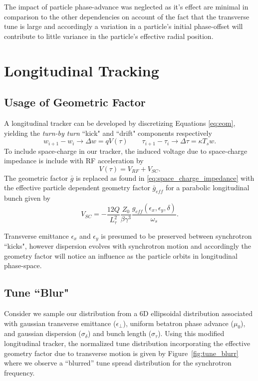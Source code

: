 The impact of particle phase-advance was neglected as it's effect are minimal in comparison to the other dependencies on account of the fact that the transverse tune is large and accordingly a variation in a particle's initial phase-offset will contribute to little variance in the particle's effective radial position.

\section{Longitudinal Tracking}

\subsection{Usage of Geometric Factor}

A longitudinal tracker can be developed by discretizing Equations \ref{eq:eom}, yielding the \textit{turn-by turn} ``kick" and ``drift" components respectively
$$w_{i+1}-w_i \to \Delta w = qV(\tau) \qquad \tau_{i+1}-\tau_i \to \Delta\tau = \kappa T_s w.$$
To include space-charge in our tracker, the induced voltage due to space-charge impedance is include with RF acceleration by
$$V(\tau) = V_{RF} + V_{SC}.$$
The geometric factor $\bar{g}$ is replaced as found in \eqref{eq:space_charge_impedance} with the effective particle dependent geometry factor $\bar{g}_{eff}$ for a parabolic longitudinal bunch given by
$$V_{SC} = -\frac{12Q}{L_\tau^2}\frac{Z_0}{\beta\gamma^3}\frac{g_{eff}(\epsilon_x,\epsilon_y,\delta)}{\omega_s}.$$

Transverse emittance $\epsilon_x$ and $\epsilon_y$ is presumed to be preserved between synchrotron ``kicks", however dispersion evolves with synchrotron motion and accordingly the geometry factor will notice an influence as the particle orbits in longitudinal phase-space.

\subsection{Tune ``Blur"}

Consider we sample our distribution from a 6D ellipsoidal distribution associated with gaussian transverse emittance ($\epsilon_\perp$), uniform betatron phase advance ($\mu_0$), and gaussian dispersion ($\sigma_\delta$) and bunch length ($\sigma_\tau$). Using this modified longitudinal tracker, the normalized tune distribution incorporating the effective geometry factor due to transverse motion is given by Figure~\ref{fig:tune_blurr} where we observe a ``blurred'' tune spread distribution for the synchrotron frequency.

